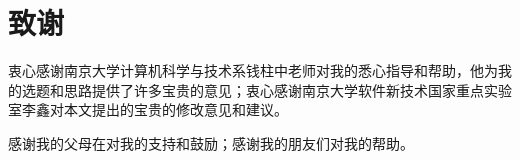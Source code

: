 \chapter*{致\qquad 谢}

衷心感谢南京大学计算机科学与技术系钱柱中老师对我的悉心指导和帮助，他为我的选题和思路提供了许多宝贵的意见；衷心感谢南京大学软件新技术国家重点实验室李鑫对本文提出的宝贵的修改意见和建议。

感谢我的父母在对我的支持和鼓励；感谢我的朋友们对我的帮助。
